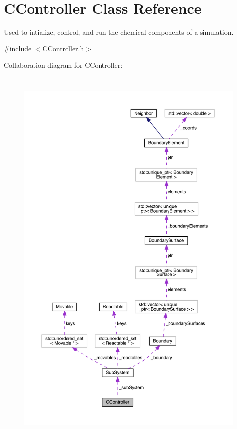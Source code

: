 \hypertarget{classCController}{\section{C\+Controller Class Reference}
\label{classCController}
}


Used to intialize, control, and run the chemical components of a simulation.  




{\ttfamily \#include $<$C\+Controller.\+h$>$}



Collaboration diagram for C\+Controller\+:
\nopagebreak
\begin{figure}[H]
\begin{center}
\leavevmode
\includegraphics[height=550pt]{classCController__coll__graph}
\end{center}
\end{figure}
